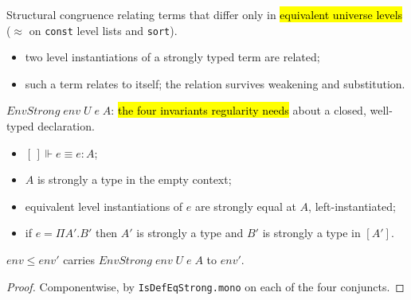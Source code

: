 \begin{definition}
\label{def:equptolevels}
\leanok
{}

 Structural congruence relating terms that differ only in \hl{equivalent
universe levels} ($\approx$ on \texttt{const} level lists and \texttt{sort}).
\begin{itemize}
\item two level instantiations of a strongly typed term are related;
\item such a term relates to itself; the relation survives weakening and substitution.
\end{itemize}
\end{definition}

\begin{definition}
\label{def:envstrong}
\leanok
{}

 $EnvStrong\;env\;U\;e\;A$: \hl{the four invariants regularity needs} about a
closed, well-typed declaration.
\begin{itemize}
\item $[\,]\Vdash e\equiv e:A$;
\item $A$ is strongly a type in the empty context;
\item equivalent level instantiations of $e$ are strongly equal at $A$, left-instantiated;
\item if $e=\Pi A'.B'$ then $A'$ is strongly a type and $B'$ is strongly a type in $[A']$.
\end{itemize}
\end{definition}

\begin{lemma}
\label{thm:envstrong-mono}
\leanok
{}

 $env\le env'$ carries $EnvStrong\;env\;U\;e\;A$ to $env'$.
\end{lemma}
\begin{proof}
\leanok
{} Componentwise, by \texttt{IsDefEqStrong.mono} on each of the four conjuncts.
\end{proof}

